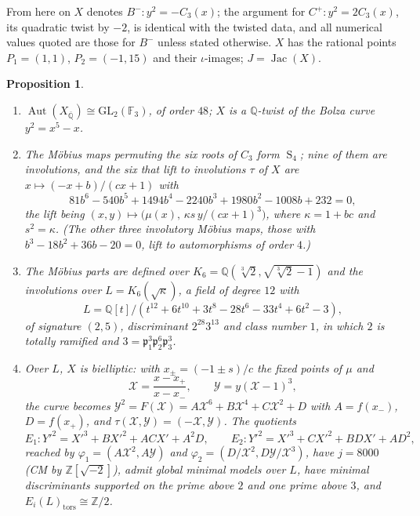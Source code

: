 \documentclass[11pt,reqno]{amsart}
\theoremstyle{plain}
\newtheorem{proposition}[theorem]{Proposition}
\theoremstyle{definition}
\newcommand{\Q}{\mathbb{Q}}
\newcommand{\Z}{\mathbb{Z}}
\newcommand{\FF}{\mathbb{F}}
\newcommand{\Qbar}{\overline{\Q}}
\newcommand{\pp}{\mathfrak{p}}
\DeclareMathOperator{\Aut}{Aut}
\DeclareMathOperator{\Jac}{Jac}
\DeclareMathOperator{\Sym}{S}
\newcommand{\tors}{\mathrm{tors}}
\numberwithin{equation}{section}
\begin{document}
From here on $X$ denotes $B^{-}\colon y^{2}=-C_{3}(x)$; the argument for
$C^{+}\colon y^{2}=2C_{3}(x)$, its quadratic twist by $-2$, is identical with
the twisted data, and all numerical values quoted are those for $B^{-}$ unless
stated otherwise. $X$ has the rational points $P_{1}=(1,1)$, $P_{2}=(-1,15)$ and
their $\iota$-images; $J=\Jac(X)$.

\begin{proposition}\label{prop:aut}
\begin{enumerate}[label=(\roman*),leftmargin=2.4em]
\item $\Aut(X_{\Qbar})\cong\mathrm{GL}_{2}(\FF_{3})$, of order $48$; $X$ is a
      $\Q$-twist of the Bolza curve $y^{2}=x^{5}-x$.
\item The M\"obius maps permuting the six roots of $C_{3}$ form $\Sym_{4}$;
      nine of them are involutions, and the six that lift to involutions $\tau$
      of $X$ are $x\mapsto(-x+b)/(cx+1)$ with
      \[
        81b^{6}-540b^{5}+1494b^{4}-2240b^{3}+1980b^{2}-1008b+232=0,
      \]
      the lift being
      $(x,y)\mapsto\bigl(\mu(x),\,\kappa s\,y/(cx+1)^{3}\bigr)$, where
      $\kappa=1+bc$ and $s^{2}=\kappa$. (The other three involutory M\"obius
      maps, those with $b^{3}-18b^{2}+36b-20=0$, lift to automorphisms of order
      $4$.)
\item The M\"obius parts are defined over
      $K_{6}=\Q(\sqrt[3]{2},\sqrt{\sqrt[3]{2}-1})$ and the involutions over
      $L=K_{6}(\sqrt{\kappa})$, a field of degree $12$ with
      \[
        L=\Q[t]/(t^{12}+6t^{10}+3t^{8}-28t^{6}-33t^{4}+6t^{2}-3),
      \]
      of signature $(2,5)$, discriminant $2^{28}3^{13}$ and class number $1$, in
      which $2$ is totally ramified and $3=\pp_{1}^{3}\pp_{2}^{6}\pp_{3}^{3}$.
\item Over $L$, $X$ is bielliptic: with $x_{\pm}=(-1\pm s)/c$ the fixed points of
      $\mu$ and
      \[
        \mathcal{X}=\frac{x-x_{+}}{x-x_{-}},\qquad
        \mathcal{Y}=y(\mathcal{X}-1)^{3},
      \]
      the curve becomes
      $\mathcal{Y}^{2}=F(\mathcal{X})=A\mathcal{X}^{6}+B\mathcal{X}^{4}+C\mathcal{X}^{2}+D$
      with $A=f(x_{-})$, $D=f(x_{+})$, and
      $\tau(\mathcal{X},\mathcal{Y})=(-\mathcal{X},\mathcal{Y})$. The quotients
      \[
        E_{1}\colon Y'^{2}=X'^{3}+BX'^{2}+ACX'+A^{2}D,\qquad
        E_{2}\colon Y'^{2}=X'^{3}+CX'^{2}+BDX'+AD^{2},
      \]
      reached by $\varphi_{1}=(A\mathcal{X}^{2},A\mathcal{Y})$ and
      $\varphi_{2}=(D/\mathcal{X}^{2},D\mathcal{Y}/\mathcal{X}^{3})$, have
      $j=8000$ (CM by $\Z[\sqrt{-2}]$), admit global minimal models over $L$,
      have minimal discriminants supported on the prime above $2$ and one prime
      above $3$, and $E_{i}(L)_{\tors}\cong\Z/2$.
\end{enumerate}
\end{proposition}
\end{document}

